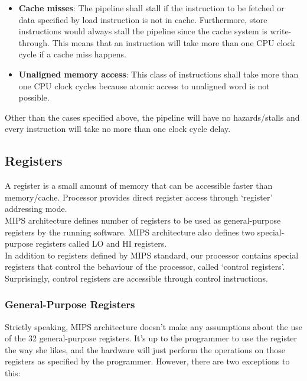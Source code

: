 \documentclass[oneside]{book}
\begin{document}
\begin{itemize}
\item \textbf{Cache misses}:
      The pipeline shall stall if the instruction to
      be fetched or data specified by load instruction is not in cache.
      Furthermore, store instructions would always stall the pipeline
      since the cache system is write-through. This means that an
      instruction will take more than one CPU clock cycle if a cache
      miss happens.

\item \textbf{Unaligned memory access}:
      This class of instructions shall take
      more than one CPU clock cycles because atomic access to unaligned
      word is not possible.

\end{itemize}

Other than the cases specified above, the pipeline will have no
hazards/stalls and every instruction will take no more than one clock cycle
delay.

\subsection{Registers}

A register is a small amount of memory that can be accessible
faster than memory/cache. Processor provides direct register
access through `register' addressing mode.\\

MIPS architecture defines number of registers to be used
as general-purpose registers by the running software. MIPS
architecture also defines two special-purpose registers called
LO and HI registers.\\

In addition to registers defined by MIPS standard, our processor
contains special registers that control the behaviour of the processor,
called `control registers'. Surprisingly, control registers are
accessible through control instructions.\\

\subsubsection{General-Purpose Registers}

Strictly speaking, MIPS architecture doesn't make any assumptions
about the use of the 32 general-purpose registers. It's up to the
programmer to use the register the way she likes, and the hardware
will just perform the operations on those registers as specified
by the programmer. However, there are two exceptions to this:
\end{document}
